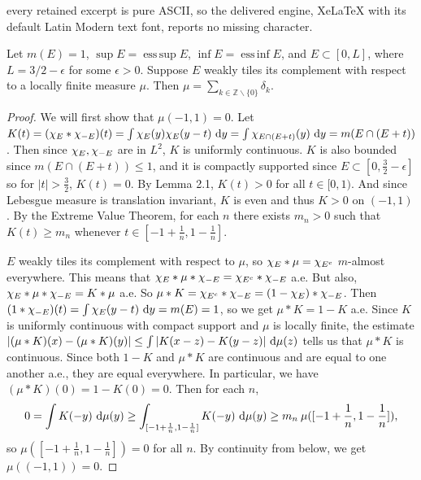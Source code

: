 \documentclass[10pt,a4paper]{amsart}
\DeclareMathOperator{\essinf}{ess\, inf}
\DeclareMathOperator{\esssup}{ess\,sup}
\begin{document}
every retained excerpt is pure ASCII, so the delivered engine, XeLaTeX with its default Latin Modern text font, reports no missing character.
\begin{proposition}
Let $m(E)=1$, $\sup E=\esssup E$, $\inf E=\essinf E$, and $E\subset [0,L]$, where $L=3/2-\epsilon$ for some $\epsilon>0$. Suppose $E$ weakly tiles its complement with respect to a locally finite measure $\mu$. Then $\mu=\sum_{k\in\mathbb{Z}\smallsetminus \{0\}}\delta_k$.
\end{proposition}

\begin{proof}
    We will first show that $\mu(-1,1)=0$. Let $K(t) = (\chi_E \ast \chi_{-E})(t) = \int \chi_E(y) \chi_{E}(y-t) \ \mathrm{d}y = \int \chi_{E \cap (E+t)}(y) \ \mathrm{d}y = m(E \cap (E+t))$. Then since $\chi_E, \chi_{-E}$ are in $L^2$, $K$ is uniformly continuous. $K$ is also bounded since $m(E \cap (E+t)) \le 1$, and it is compactly supported since $E \subset [0, \frac 32 - \epsilon]$ so for $|t| > \frac 3 2$, $K(t) = 0$. By Lemma 2.1, $K(t) > 0$ for all $t \in [0,1)$. And since Lebesgue measure is translation invariant, $K$ is even and thus $K>0$ on $(-1,1)$. By the Extreme Value Theorem, for each $n$ there exists $m_n>0$ such that $K(t) \ge m_n$ whenever $t \in [-1+\frac{1}{n}, 1 - \frac 1 n]$. 
    
    $E$ weakly tiles its complement with respect to $\mu$, so $\chi_E \ast \mu = \chi_{E^c}$ $m$-almost everywhere.   This means that $\chi_E \ast \mu \ast \chi_{-E} = \chi_{E^c} \ast \chi_{-E}$ a.e. But also, $\chi_E \ast \mu \ast \chi_{-E} = K \ast \mu$ a.e. So $\mu \ast K = \chi_{E^c} \ast \chi_{-E} = (1 - \chi_E) \ast \chi_{-E}$. Then $(1 \ast \chi_{-E})(t) = \int \chi_E(y-t) \ \mathrm{d}y =m(E)= 1$, so we get $\mu \ast K = 1 - K$ a.e. Since $K$ is uniformly continuous with compact support and $\mu$ is locally finite, the estimate $|(\mu \ast K)(x) - (\mu \ast K)(y)| \le \int |K(x-z) - K(y-z)| \ \mathrm{d}\mu(z)$ tells us that $\mu*K$ is continuous. Since both $1-K$ and $\mu*K$ are continuous and are equal to one another a.e., they are equal everywhere. In particular, we have $(\mu \ast K)(0) = 1 - K(0) = 0$. Then for each $n$, $$0 = \int K(-y) \ \mathrm{d}\mu(y) \ge \int_{[-1 + \frac 1 n, 1-\frac{1}{n}]} K(-y) \ \mathrm{d}\mu(y) \ge m_n \: \mu([-1+\frac 1 n, 1-\frac{1}{n}]),$$ so $\mu([-1 + \frac 1 n, 1-\frac{1}{n}]) = 0$ for all $n$. By continuity from below, we get $\mu((-1, 1)) = 0$. 
    

\end{proof}
\end{document}
